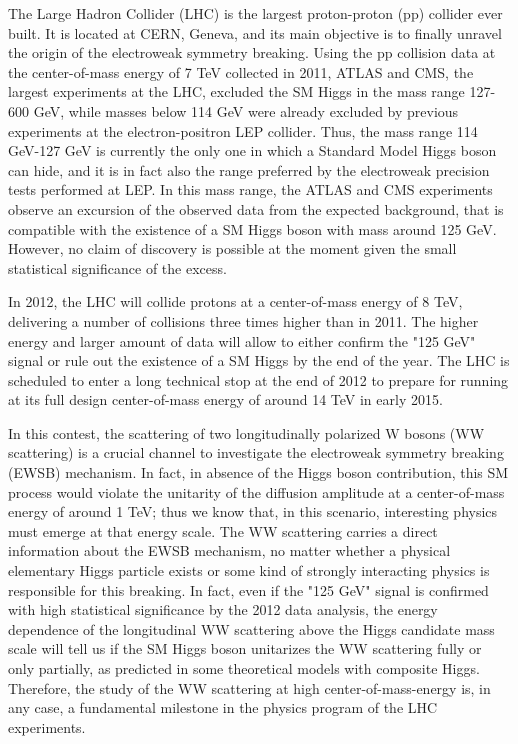 \documentclass[10pt, a4paper]{article}
\begin{document}
The Large Hadron Collider (LHC) is the largest proton-proton (pp) collider ever built. 
It is located at CERN, Geneva, and its main objective is to finally unravel the origin 
of the electroweak symmetry breaking. Using the pp collision data at the center-of-mass energy
of 7 TeV collected in 2011, ATLAS and CMS, the 
largest experiments at the LHC, excluded the SM Higgs in the mass range 
127-600 GeV, while masses below 114 GeV were already excluded by 
previous experiments at the electron-positron LEP collider. 
Thus, the mass range 114 GeV-127 GeV is currently the only one in which 
a Standard Model Higgs boson can hide, and it is in fact also the range 
preferred by the electroweak precision tests performed at LEP. 
In this mass range, the ATLAS and CMS experiments observe an excursion of 
the observed data from the expected background, that is compatible with the existence 
of a SM Higgs boson with mass around 125 GeV. However, no claim of 
discovery is possible at the moment given the small statistical significance of the excess. 

In 2012, the LHC will collide protons at a center-of-mass energy of 8 TeV, delivering 
a number of collisions three times higher than in 2011. The higher energy and larger 
amount of data will allow to either confirm the "125 GeV" signal or rule out the existence 
of a SM Higgs by the end of the year. The LHC is scheduled to enter a 
long technical stop at the end of 2012 to prepare for running at its full design 
center-of-mass energy of around 14 TeV in early 2015.

In this contest, the scattering of two longitudinally polarized 
W bosons (WW scattering) is a crucial channel to 
investigate the electroweak symmetry breaking (EWSB) mechanism.
In fact, in absence of the Higgs boson contribution, this SM process
would violate the unitarity of the diffusion amplitude
at a center-of-mass energy of around 1 TeV; thus we know that, in this scenario, 
interesting physics must emerge at that energy scale.
The WW scattering carries a direct information about the EWSB 
mechanism, no matter whether a physical elementary Higgs particle 
exists or some kind of strongly interacting physics is responsible for this breaking. 
In fact, even if the "125 GeV" signal is confirmed with high statistical significance by the 
2012 data analysis, the energy dependence of the longitudinal WW scattering 
above the Higgs candidate mass scale will tell us if the SM Higgs boson 
unitarizes the WW scattering fully or only partially, as predicted in some 
theoretical models with composite Higgs. Therefore, the study of the WW scattering 
at high center-of-mass-energy is, in any case, a fundamental milestone 
in the physics program of the LHC experiments. \\
\end{document}
